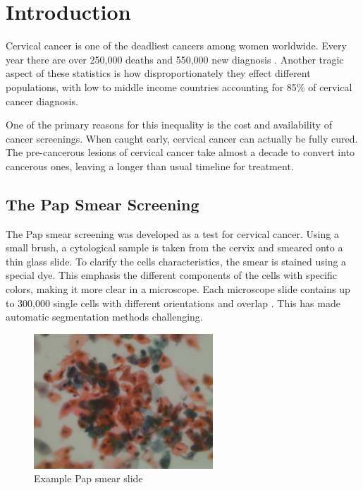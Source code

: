 \documentclass[ms,electronic,oneside,twosidetoc,letterpaper,chaptercenter,parttop]{byumsphd}
\title{\Title}
\author{\Author}
\begin{document}
\maketitle
{}

\chapter{Introduction}

Cervical cancer is one of the deadliest cancers among women worldwide. Every year there are over
250,000 deaths and 550,000 new diagnosis \cite{kiran}. Another tragic aspect of these statistics is how disproportionately
they effect different populations, with low to middle income countries accounting for 85\% of cervical cancer diagnosis.

One of the primary reasons for this inequality is the cost and availability of cancer screenings. When caught early, cervical cancer can actually be fully cured. 
The pre-cancerous lesions of cervical cancer take almost a decade to convert into cancerous ones, leaving a longer than usual timeline for treatment. \cite{epid}

\section{The Pap Smear Screening}

The Pap smear screening was developed as a test for cervical cancer. Using a small brush, a cytological sample is taken from the cervix and smeared onto a thin glass slide. 
To clarify the cells characteristics, the smear is stained using a special dye. This emphasis the different components of the cells with specific colors, making it more clear in a microscope.
Each microscope slide contains up to 300,000 single cells with different orientations and overlap \cite{herlev2}. This has made automatic segmentation methods challenging.

\begin{figure}[H]
  \centering
  \includegraphics[width=0.60\textwidth]{cells/dysketarotic_059}
  \caption{Example Pap smear slide}
\end{figure}
\end{document}
